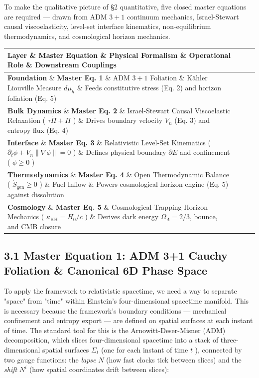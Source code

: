 \documentclass[11pt,a4paper]{article}
\theoremstyle{definition}\newtheorem{definition}{Definition}
\theoremstyle{remark}\newtheorem{remark}{Remark}
\begin{document}
To make the qualitative picture of §2 quantitative, five closed master equations are required — drawn from ADM $3+1$ continuum mechanics, Israel-Stewart causal viscoelasticity, level-set interface kinematics, non-equilibrium thermodynamics, and cosmological horizon mechanics.

\begin{longtable}{llll}
\hline
Layer \& Master Equation \& Physical Formalism \& Operational Role \& Downstream Couplings \\
\hline
\textbf{Foundation} \& \textbf{Master Eq. 1} \& ADM $3+1$ Foliation \& Kähler Liouville Measure $d\mu_h$ \& Feeds constitutive stress (Eq. 2) and horizon foliation (Eq. 5) \\
\textbf{Bulk Dynamics} \& \textbf{Master Eq. 2} \& Israel-Stewart Causal Viscoelastic Relaxation ( $\tau \dot{\Pi} + \Pi$ ) \& Drives boundary velocity $V_n$ (Eq. 3) and entropy flux (Eq. 4) \\
\textbf{Interface} \& \textbf{Master Eq. 3} \& Relativistic Level-Set Kinematics ( $\partial_t \phi + V_n \|\nabla \phi\| = 0$ ) \& Defines physical boundary $\partial E$ and confinement ( $\phi \ge 0$ ) \\
\textbf{Thermodynamics} \& \textbf{Master Eq. 4} \& Open Thermodynamic Balance ( $\dot{S}_{\text{gen}} \ge 0$ ) \& Fuel Inflow \& Powers cosmological horizon engine (Eq. 5) against dissolution \\
\textbf{Cosmology} \& \textbf{Master Eq. 5} \& Cosmological Trapping Horizon Mechanics ( $\kappa_{\text{KH}} = H_0/c$ ) \& Derives dark energy $\Omega_\Lambda = 2/3$, bounce, and CMB closure \\
\hline
\end{longtable}\subsection{3.1 Master Equation 1: ADM 3+1 Cauchy Foliation \& Canonical 6D Phase Space}

To apply the framework to relativistic spacetime, we need a way to separate "space" from "time" within Einstein's four-dimensional spacetime manifold. This is necessary because the framework's boundary conditions — mechanical confinement and entropy export — are defined on spatial surfaces at each instant of time. The standard tool for this is the Arnowitt-Deser-Misner (ADM) decomposition, which slices four-dimensional spacetime into a stack of three-dimensional spatial surfaces $\Sigma_t$ (one for each instant of time $t$ ), connected by two gauge functions: the \textit{lapse} $N$ (how fast clocks tick between slices) and the \textit{shift} $N^i$ (how spatial coordinates drift between slices):
\end{document}
